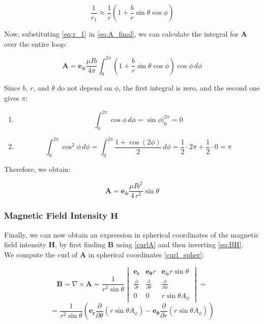 \begin{equation}
    \frac{1}{r_1} \approx \frac{1}{r} 
    \left( 1 + \frac{b}{r} \sin \theta \cos \phi \right)
    \label{eq:r_1}
\end{equation}

Now, substituting \ref{eq:r_1} in \ref{eq:A_final}, we 
can calculate the integral for \( \mathbf{A} \) over 
the entire loop:

$$
    \mathbf{A} = \mathbf{e_\phi} \frac{\mu I b}{4 \pi} 
    \int_{0}^{2\pi} \left( 1 + \frac{b}{r} \sin \theta 
    \cos \phi \right) \cos \phi \, d\phi
$$

Since \( b \), \( r \), and $\theta$ do not depend on 
$\phi$, the first integral is zero, and the second one 
gives $\pi$:

\begin{enumerate}[label=(\arabic*)]
    \item 
    \parbox{\textwidth}{
    \[
        \int_0^{2\pi} \cos \phi \, d\phi = \sin \phi \Big|_0^{2\pi} = 0
    \]
    }

    \item 
    \parbox{\textwidth}{
    \[
        \int_{0}^{2\pi} \cos^2 \phi \, d\phi = \int_{0}^{2\pi} 
        \frac{1 + \cos(2\phi)}{2} \, d\phi = \frac{1}{2} \cdot 2\pi 
        + \frac{1}{2} \cdot 0 = \pi
    \]
    }
\end{enumerate}

Therefore, we obtain:

\begin{equation}
    \mathbf{A} = \mathbf{e_\phi} \frac{\mu I b^2}{4 \, r^2} 
    \sin \theta
    \label{eq:A_spher}
\end{equation}

\subsubsection{Magnetic Field Intensity $\mathbf{H}$}
Finally, we can now obtain an expression in spherical 
coordinates of the magnetic field intensity 
$\mathbf{H}$, by first finding $\mathbf{B}$ using 
\ref{curlA} and then inverting \ref{eq:BH}.
\\
We compute the curl of $\mathbf{A}$ in spherical 
coordinates \ref{curl_spher}:

\[
    \mathbf{B} = \nabla \times \mathbf{A} = \frac{1}{r^2 \sin \theta} 
    \begin{vmatrix}
        \mathbf{e_r} & \mathbf{e_\theta} r & \mathbf{e_\phi} r \sin \theta \\
        \frac{\partial}{\partial r} & \frac{\partial}{\partial \theta} & 
        \frac{\partial}{\partial \phi} \\
        0 & 0 & r \sin \theta A_\phi
    \end{vmatrix} =
\]
\[
    = \frac{1}{r^2 \sin \theta} \left( \mathbf{e_r} 
    \frac{\partial}{\partial \theta} (r \sin \theta A_\phi) 
    - \mathbf{e_\theta} \frac{\partial}{\partial r} 
    (r \sin \theta A_\phi) \right)
\]

